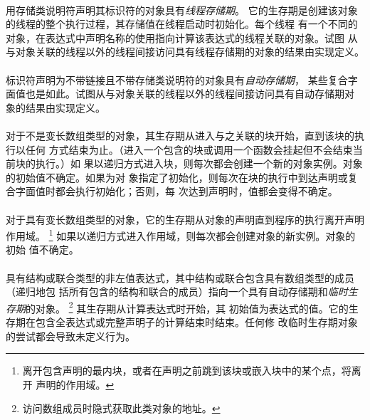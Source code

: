 \paragraph{}
用存储类说明符声明其标识符的对象具有\textit{线程存储期}。
它的生存期是创建该对象的线程的整个执行过程，其存储值在线程启动时初始化。每个线程
有一个不同的对象，在表达式中声明名称的使用指向计算该表达式的线程关联的对象。试图
从与对象关联的线程以外的线程间接访问具有线程存储期的对象的结果由实现定义。

\paragraph{}
标识符声明为不带链接且不带存储类说明符的对象具有\textit{自动存储期}，
某些复合字面值也是如此。试图从与对象关联的线程以外的线程间接访问具有自动存储期对
象的结果由实现定义。

\paragraph{}
对于不是变长数组类型的对象，其生存期从进入与之关联的块开始，直到该块的执行以任何
方式结束为止。（进入一个包含的块或调用一个函数会挂起但不会结束当前块的执行。）如
果以递归方式进入块，则每次都会创建一个新的对象实例。对象的初始值不确定。如果为对
象指定了初始化，则每次在块的执行中到达声明或复合字面值时都会执行初始化；否则，每
次达到声明时，值都会变得不确定。

\paragraph{}
对于具有变长数组类型的对象，它的生存期从对象的声明直到程序的执行离开声明作用域。
\footnote{离开包含声明的最内块，或者在声明之前跳到该块或嵌入块中的某个点，将离开
声明的作用域。} 如果以递归方式进入作用域，则每次都会创建对象的新实例。对象的初始
值不确定。

\paragraph{}
具有结构或联合类型的非左值表达式，其中结构或联合包含具有数组类型的成员（递归地包
括所有包含的结构和联合的成员）指向一个具有自动存储期和\textit{临时生存期}的对象。
\footnote{访问数组成员时隐式获取此类对象的地址。} 其生存期从计算表达式时开始，其
初始值为表达式的值。它的生存期在包含全表达式或完整声明子的计算结束时结束。任何修
改临时生存期对象的尝试都会导致未定义行为。


